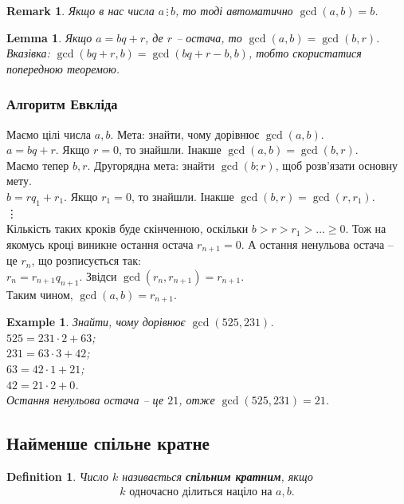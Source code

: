 \documentclass[a4paper, 10pt]{article}
\theoremstyle{theoremdd}
\theoremstyle{theoremdd}
\newtheorem{definition}[theorem]{Definition}
\theoremstyle{theoremdd}
\theoremstyle{theoremdd}
\newtheorem{example}[theorem]{Example}
\theoremstyle{theoremdd}
\theoremstyle{theoremdd}
\newtheorem{remark}[theorem]{Remark}
\theoremstyle{theoremdd}
\newtheorem{lemma}[theorem]{Lemma}
\theoremstyle{theoremdd}
\newcommand\divisibleBy{\, \vdots \,}
\begin{document}
\begin{remark}
Якщо в нас числа $a \divisibleBy b$, то тоді автоматично $\gcd(a,b) = b$.
\end{remark}

\begin{lemma}
Якщо $a = bq+r$, де $r$ -- остача, то $\gcd(a,b) = \gcd(b,r)$.\\
\textit{Вказівка: $\gcd(bq+r,b) = \gcd(bq+r-b,b)$, тобто скористатися попередною теоремою.}
\end{lemma}

\subsubsection*{Алгоритм Евкліда}
Маємо цілі числа $a,b$. Мета: знайти, чому дорівнює $\gcd(a,b)$.\\
$a = bq + r$. Якщо $r = 0$, то знайшли. Інакше $\gcd(a,b) = \gcd(b,r)$.\\
Маємо тепер $b,r$. Другорядна мета: знайти $\gcd(b;r)$, щоб розв'язати основну мету.\\
$b = rq_1 + r_1$. Якщо $r_1 = 0$, то знайшли. Інакше $\gcd(b,r) = \gcd(r,r_1)$.\\
\vdots \\
Кількість таких кроків буде скінченною, оскільки $b > r > r_1 > \dots \geq 0$. Тож на якомусь кроці виникне остання остача $r_{n+1} = 0$. А остання ненульова остача -- це $r_n$, що розписується так:\\
$r_n = r_{n+1}q_{n+1}$. Звідси $\gcd(r_n,r_{n+1}) = r_{n+1}$.\\
Таким чином, $\gcd(a,b) = r_{n+1}$.

\begin{example}
Знайти, чому дорівнює $\gcd(525,231)$.\\
$525 = 231 \cdot 2 + 63$;\\
$231 = 63 \cdot 3 + 42$;\\
$63 = 42 \cdot 1 + 21$;\\
$42 = 21 \cdot 2 + 0$.\\
Остання ненульова остача -- це $21$, отже $\gcd(525,231) = 21$.
\end{example}

\subsection{Найменше спільне кратне}
\begin{definition}
Число $k$ називається \textbf{спільним кратним}, якщо
\begin{align*}
\text{$k$ одночасно ділиться націло на $a,b$}.
\end{align*}
\end{definition}
\end{document}
